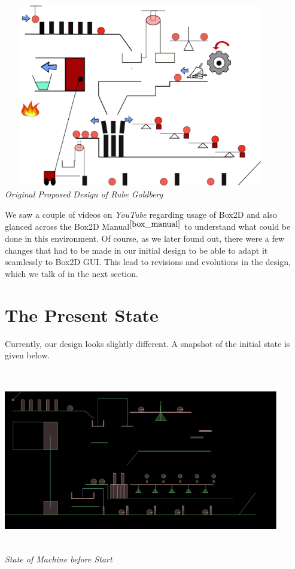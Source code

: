 \documentclass[a4paper,11pt]{article}
\begin{document}
\begin{center}
\includegraphics[width=120mm, height=80mm]{RubeGoldberg.eps}\\
\emph{Original Proposed Design of Rube Goldberg}
\end{center}

We saw a couple of videos on \emph{YouTube} regarding usage of Box2D and also glanced across the Box2D Manual$^{\cite{box_manual}}$ to understand what could be done in this environment. Of course, as we later found out, there were a few changes that had to be made in our initial design to be able to adapt it seamlessly to Box2D GUI. This lead to revisions and evolutions in the design, which we talk of in the next section.

\section{The Present State}

Currently, our design looks slightly different. A snapshot of the initial state is given below.

\begin{center}
\includegraphics[width=120mm, height=80mm]{state_00.eps}\\
\emph{State of Machine before Start}
\end{center}
\end{document}

